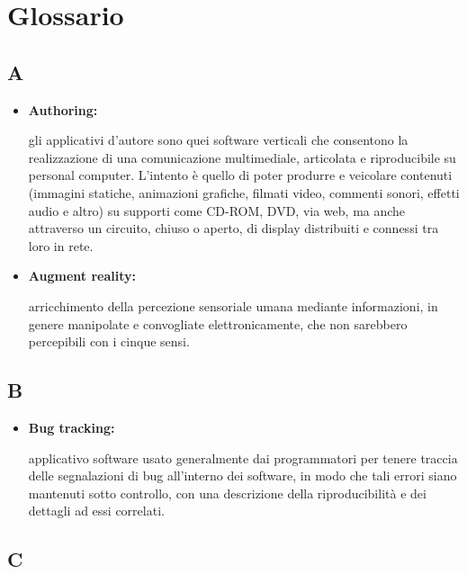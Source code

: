 \appendix
\newpage
\chapter{Glossario}

\section*{A}

\begin{itemize}
	\item \hypertarget{auth}{\textbf{Authoring:}} gli applicativi d'autore sono quei software verticali che consentono la realizzazione di una comunicazione multimediale, articolata e riproducibile su personal computer. L'intento è quello di poter produrre e veicolare contenuti (immagini statiche, animazioni grafiche, filmati video, commenti sonori, effetti audio e altro) su supporti come CD-ROM, DVD, via web, ma anche attraverso un circuito, chiuso o aperto, di display distribuiti e connessi tra loro in rete.
\end{itemize}

\begin{itemize}
	\item \hypertarget{ar}{\textbf{Augment reality:}} arricchimento della percezione sensoriale umana mediante informazioni, in genere manipolate e convogliate elettronicamente, che non sarebbero percepibili con i cinque sensi.
\end{itemize}

\section*{B}

\begin{itemize}
	\item \hypertarget{bg}{\textbf{Bug tracking:}}  applicativo software usato generalmente dai programmatori per tenere traccia delle segnalazioni di bug all'interno dei software, in modo che tali errori siano mantenuti sotto controllo, con una descrizione della riproducibilità e dei dettagli ad essi correlati.
\end{itemize}

\section*{C}

